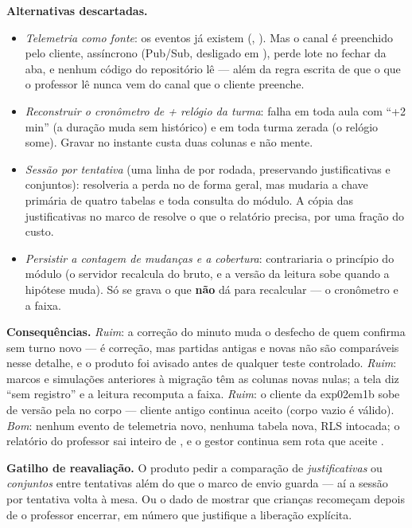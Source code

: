 \textbf{Alternativas descartadas.}
\begin{itemize}
  \item \emph{Telemetria como fonte}: os eventos já existem
    (, ). Mas o canal é
    preenchido pelo cliente, assíncrono (Pub/Sub, desligado em ),
    perde lote no fechar da aba, e nenhum código do repositório lê
     --- além da regra escrita de que o que o professor
    lê nunca vem do canal que o cliente preenche.
  \item \emph{Reconstruir o cronômetro de  + relógio da turma}:
    falha em toda aula com \enquote{+2 min} (a duração muda sem histórico) e
    em toda turma zerada (o relógio some). Gravar no instante custa duas
    colunas e não mente.
  \item \emph{Sessão por tentativa} (uma linha de  por
    rodada, preservando justificativas e conjuntos): resolveria a perda no
     de forma geral, mas mudaria a chave primária de quatro
    tabelas e toda consulta do módulo. A cópia das justificativas no marco de
     resolve o que o relatório precisa, por uma fração do custo.
  \item \emph{Persistir a contagem de mudanças e a cobertura}: contrariaria o
    princípio do módulo (o servidor recalcula do bruto, e a versão da leitura
    sobe quando a hipótese muda). Só se grava o que \textbf{não} dá para
    recalcular --- o cronômetro e a faixa.
\end{itemize}

\textbf{Consequências.} \emph{Ruim}: a correção do minuto muda o desfecho de
quem confirma sem turno novo --- é correção, mas partidas antigas e novas não
são comparáveis nesse detalhe, e o produto foi avisado antes de qualquer teste
controlado. \emph{Ruim}: marcos e simulações anteriores à migração têm as
colunas novas nulas; a tela diz \enquote{sem registro} e a leitura recomputa a
faixa. \emph{Ruim}: o cliente da exp02em1b sobe de versão pela  no
corpo --- cliente antigo continua aceito (corpo vazio é válido). \emph{Bom}:
nenhum evento de telemetria novo, nenhuma tabela nova, RLS intocada; o
relatório do professor sai inteiro de ,
e o gestor continua sem rota que aceite .

\textbf{Gatilho de reavaliação.} O produto pedir a comparação de
\emph{justificativas} ou \emph{conjuntos} entre tentativas além do que o marco
de envio guarda --- aí a sessão por tentativa volta à mesa. Ou o dado de
 mostrar que crianças recomeçam depois de o professor encerrar,
em número que justifique a liberação explícita.

